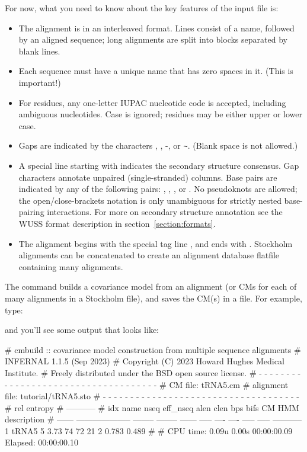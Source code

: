 For now, what you need to know about the key features of the input file is:
\begin{itemize}
\item The alignment is in an interleaved format.
Lines consist of a name, followed by an aligned sequence;
long alignments are split into blocks separated by blank lines.
\item Each sequence must have a unique name that has zero spaces in it. (This is important!)
\item For residues, any one-letter IUPAC nucleotide code is accepted,
      including ambiguous nucleotides. Case is ignored; residues
      may be either upper or lower case.
\item Gaps are indicated by the characters , \otext{\_}, -, or \verb+~+.
      (Blank space is not allowed.)
\item A special line starting with  indicates
      the secondary structure consensus. Gap characters annotate
      unpaired (single-stranded) columns. Base pairs are indicated
      by any of the following pairs: \otext{<>}, \otext{()}, \otext{[]},
      or \otext{\{\}}. No pseudoknots are allowed; the
      open/close-brackets notation is only unambiguous for strictly
      nested base-pairing interactions.
      For more on secondary structure annotation see the WUSS format
      description in section~\ref{section:formats}.
\item The alignment begins with the special tag line
      , and ends with \otext{//}.
      Stockholm alignments
      can be concatenated to create an alignment database flatfile
      containing many alignments.
\end{itemize}

The  command builds a covariance model from an alignment (or
CMs for each of many alignments in a Stockholm file), and saves the
CM(s) in a file. For example, type:


and you'll see some output that looks like:

\begin{sreoutput}
# cmbuild :: covariance model construction from multiple sequence alignments
# INFERNAL 1.1.5 (Sep 2023)
# Copyright (C) 2023 Howard Hughes Medical Institute.
# Freely distributed under the BSD open source license.
# - - - - - - - - - - - - - - - - - - - - - - - - - - - - - - - - - - - -
# CM file:                                            tRNA5.cm
# alignment file:                                     tutorial/tRNA5.sto
# - - - - - - - - - - - - - - - - - - - - - - - - - - - - - - - - - - - -
#                                                                      rel entropy
#                                                                      -----------
# idx    name                     nseq eff_nseq   alen  clen  bps bifs    CM   HMM description
# ------ -------------------- -------- -------- ------ ----- ---- ---- ----- ----- -----------
       1 tRNA5                       5     3.73     74    72   21    2 0.783 0.489 
#
# CPU time: 0.09u 0.00s 00:00:00.09 Elapsed: 00:00:00.10
\end{sreoutput}

